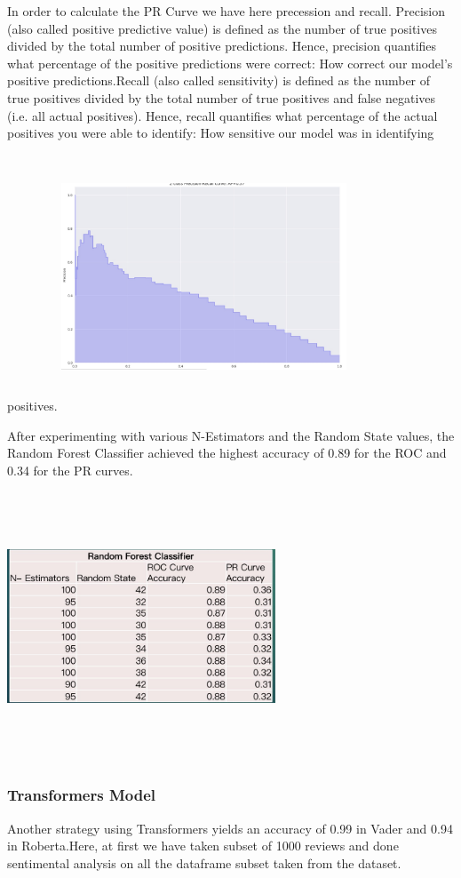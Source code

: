 In order to calculate the PR Curve we have here precession and recall. Precision (also called positive predictive value) is defined as the number of true positives divided by the total number of positive predictions. Hence, precision quantifies what percentage of the positive predictions were correct: How correct our model's positive predictions.Recall (also called sensitivity) is defined as the number of true positives divided by the total number of true positives and false negatives (i.e. all actual positives). Hence, recall quantifies what percentage of the actual positives you were able to identify: How sensitive our model was in identifying positives.
\includegraphics[width=8.5cm, height=8cm ]{pr.jpeg}

After experimenting with various N-Estimators and the Random State values, the Random Forest Classifier achieved the highest accuracy of 0.89 for the ROC and 0.34 for the PR curves.

\includegraphics[width=8cm, height=8cm ]{ra.jpeg}
\subsubsection{Transformers Model}
Another strategy using Transformers yields an accuracy of 0.99 in Vader and 0.94 in Roberta.Here, at first we have taken subset of 1000 reviews and done sentimental analysis on all the dataframe subset taken from the dataset.

